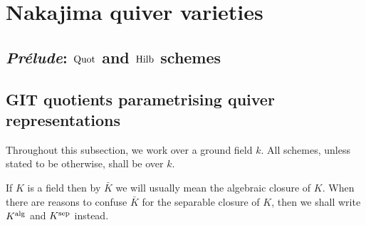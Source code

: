 \section{Nakajima quiver varieties}
    \subsection{\textit{Pr\'elude}: \texorpdfstring{$\mathrm{Quot}$}{} and \texorpdfstring{$\mathrm{Hilb}$}{} schemes}

    \subsection{GIT quotients parametrising quiver representations}
        \begin{convention}
            Throughout this subsection, we work over a ground field $k$. All schemes, unless stated to be otherwise, shall be over $k$.
        \end{convention}
        \begin{convention}
            If $K$ is a field then by $\bar{K}$ we will usually mean the algebraic closure of $K$. When there are reasons to confuse $\bar{K}$ for the separable closure of $K$, then we shall write $K^{\mathrm{alg}}$ and $K^{\mathrm{sep}}$ instead. 
        \end{convention}
        
